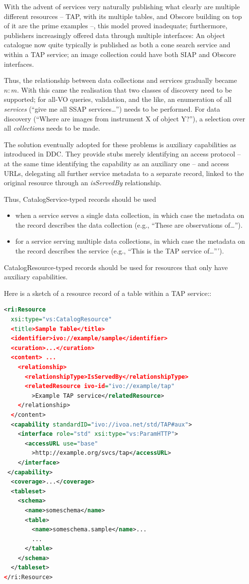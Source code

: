\documentclass[11pt,a4paper]{ivoa}
\begin{document}
With the advent of services very naturally publishing what clearly
are multiple different resources -- TAP, with its multiple tables, and
Obscore building on top of it are the prime examples --, this model
proved inadequate; furthermore, publishers increasingly offered data
through multiple interfaces: An object catalogue now quite typically is
published as both a cone search service and within a TAP service; an
image collection could have both SIAP and Obscore interfaces.

Thus, the relationship between data collections and services gradually
became $n:m$.  With this came the realisation that two classes of
discovery need to be supported; for all-VO queries, validation, and the
like, an enumeration of all \emph{services} (``give me all SSAP
services\dots'') needs to be performed.  For data discovery (``Where are
images from instrument X of object Y?''), a selection over all
\emph{collections} needs to be made.

The solution eventually adopted for these problems is auxiliary
capabilities as introduced in DDC.  They provide stubs merely
identifying an access protocol -- at the same time identifying the
capability as an auxiliary one --  and access URLs, delegating all
further service metadata to a separate record, linked to the original
resource through an \emph{isServedBy} relationship.

Thus, CatalogService-typed records should be used

\begin{itemize}
\item when a service serves a single data collection, in which case the
metadata on the record describes the data collection (e.g., ``These are
observations of\dots'').
\item for a service serving multiple data collections, in which case the
metadata on the record  describes the service (e.g., ``This is the TAP
service of\dots''').
\end{itemize}

CatalogResource-typed records should be used for resources that only
have auxiliary capabilities.

Here is a sketch of a resource record of a table within a TAP service::

\begin{lstlisting}[language=XML,basicstyle=\footnotesize]
<ri:Resource 
  xsi:type="vs:CatalogResource"
  <title>Sample Table</title>
  <identifier>ivo://example/sample</identifier>
  <curation>...</curation>
  <content> ...
    <relationship>
      <relationshipType>IsServedBy</relationshipType>
      <relatedResource ivo-id="ivo://example/tap"
        >Example TAP service</relatedResource>
    </relationship>
  </content>
  <capability standardID="ivo://ivoa.net/std/TAP#aux">
    <interface role="std" xsi:type="vs:ParamHTTP">
      <accessURL use="base"
        >http://example.org/svcs/tap</accessURL>
    </interface>
 </capability>
  <coverage>...</coverage>
  <tableset>
    <schema>
      <name>someschema</name>
      <table>
        <name>someschema.sample</name>...
        ...
      </table>
    </schema>
  </tableset>
</ri:Resource>
\end{lstlisting}
\end{document}
